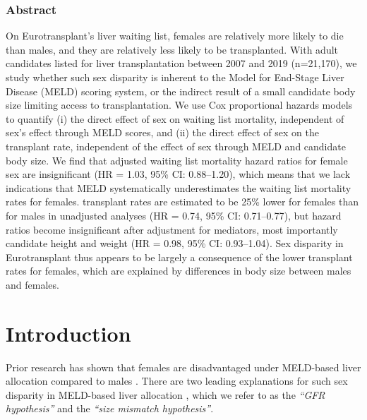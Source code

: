 \documentclass[11pt,twoside,]{book}
\begin{document}
\newpage
\normalsize

\subsubsection*{Abstract}

On Eurotransplant's liver waiting list, females are relatively more likely to
die than males, and they are relatively less likely to be transplanted. With adult
candidates listed for liver transplantation between 2007
and 2019 (n=21,170), we study whether such sex disparity
is inherent to the Model for End-Stage Liver Disease (MELD) scoring system,
or the indirect result of a small candidate body size limiting access to
transplantation. We use Cox proportional hazards models to quantify (i) the
direct effect of sex on waiting list mortality, independent of sex's effect
through MELD scores, and (ii) the direct effect of sex on the transplant rate,
independent of the effect of sex through MELD and candidate body size. We find that
adjusted waiting list mortality hazard ratios for female sex are insignificant
(HR = 1.03, 95\% CI: 0.88--1.20), which means that we lack indications that MELD
systematically underestimates the waiting list mortality rates for females.
transplant rates are estimated to be 25\% lower for females than for males in unadjusted
analyses (HR = 0.74, 95\% CI: 0.71--0.77), but hazard ratios become insignificant
after adjustment for mediators, most importantly candidate height
and weight (HR = 0.98, 95\% CI: 0.93--1.04). Sex disparity in Eurotransplant
thus appears to be largely a consequence of the lower transplant rates for females,
which are explained by differences in body size between males and females.

\newpage

\normalsize

\section{Introduction}\label{introduction-1}

Prior research has shown that females are disadvantaged
under MELD-based liver allocation compared to males \citep{moylanDisparitiesLiverTransplantation2008, mathurSexBasedDisparitiesLiver2011, laiHeightContributesGender2010, lockeQuantifyingSexBasedDisparities2020a}.
There are two leading
explanations for such sex disparity in MELD-based liver allocation \citep{vernaTimeActionAddress2020}, which we refer to as the \emph{``GFR hypothesis''} and the \emph{``size mismatch hypothesis''}.
\end{document}

